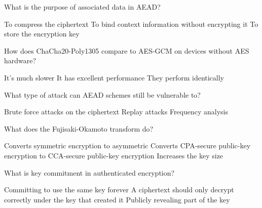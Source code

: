 \documentclass[10pt,a4paper,american]{exam}
\begin{document}
\begin{questions}
	\question What is the purpose of associated data in AEAD?
	\begin{randomizechoices}
		\choice To compress the ciphertext
		\CorrectChoice To bind context information without encrypting it
		\choice To store the encryption key
	\end{randomizechoices}

	\question How does ChaCha20-Poly1305 compare to AES-GCM on devices without AES hardware?
	\begin{randomizechoices}
		\choice It's much slower
		\CorrectChoice It has excellent performance
		\choice They perform identically
	\end{randomizechoices}

	\question What type of attack can AEAD schemes still be vulnerable to?
	\begin{randomizechoices}
		\choice Brute force attacks on the ciphertext
		\CorrectChoice Replay attacks
		\choice Frequency analysis
	\end{randomizechoices}

	\question What does the Fujisaki-Okamoto transform do?
	\begin{randomizechoices}
		\choice Converts symmetric encryption to asymmetric
		\CorrectChoice Converts CPA-secure public-key encryption to CCA-secure public-key encryption
		\choice Increases the key size
	\end{randomizechoices}

	\question What is key commitment in authenticated encryption?
	\begin{randomizechoices}
		\choice Committing to use the same key forever
		\CorrectChoice A ciphertext should only decrypt correctly under the key that created it
		\choice Publicly revealing part of the key
	\end{randomizechoices}

\end{questions}

\clearpage

\end{document}
